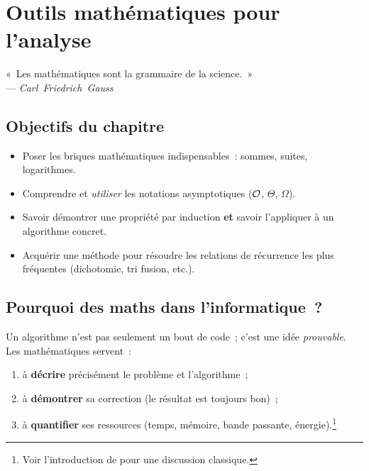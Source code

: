 
\chapter{Outils mathématiques pour l’analyse}

\begin{flushright}\small
« Les mathématiques sont la grammaire de la science. »\\[-0.2em]
— \textit{Carl Friedrich Gauss}
\end{flushright}

\section*{Objectifs du chapitre}
\begin{itemize}[label=\small$\blacktriangleright$]
  \item Poser les briques mathématiques indispensables : sommes, suites,
        logarithmes.
  \item Comprendre et \emph{utiliser} les notations asymptotiques
        ($\mathcal{O}$, $\Theta$, $\Omega$).
  \item Savoir démontrer une propriété par induction \textbf{et} savoir
        l’appliquer à un algorithme concret.
  \item Acquérir une méthode pour résoudre les relations de récurrence
        les plus fréquentes (dichotomie, tri fusion, etc.).
\end{itemize}
\vspace{0.8em}

\section{Pourquoi des maths dans l’informatique ?}
Un algorithme n’est pas seulement un bout de code ; c’est une idée
\emph{prouvable}. Les mathématiques servent :
\begin{enumerate}
  \item à \textbf{décrire} précisément le problème et l’algorithme ;
  \item à \textbf{démontrer} sa correction (le résultat est toujours bon) ;
  \item à \textbf{quantifier} ses ressources (temps, mémoire, bande
        passante, énergie).\footnote{Voir l’introduction de
        \cite{Cormen2022} pour une discussion classique.}
\end{enumerate}

